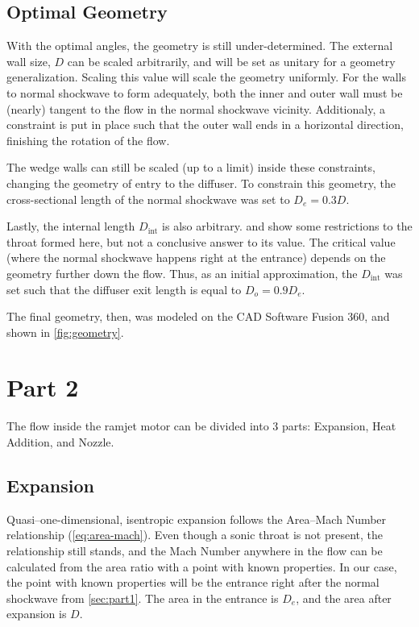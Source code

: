 \documentclass[12pt, openright, oneside, a4paper, english]{unbtex}
\begin{document}
\section{Optimal Geometry}

With the optimal angles, the geometry is still under-determined. The external wall size, \(D\) can be scaled arbitrarily, and will be set as unitary for a geometry generalization. Scaling this value will scale the geometry uniformly. For the walls to normal shockwave to form adequately, both the inner and outer wall must be (nearly) tangent to the flow in the normal shockwave vicinity. Additionaly, a constraint is put in place such that the outer wall ends in a horizontal direction, finishing the rotation of the flow.

The wedge walls can still be scaled (up to a limit) inside these constraints, changing the geometry of entry to the diffuser. To constrain this geometry, the cross-sectional length of the normal shockwave was set to \(D_e = 0.3 D\).

Lastly, the internal length \(D_{\operatorname{int}}\) is also arbitrary. \textcite{oswatitsch1944} and \textcite{hermann1956} show some restrictions to the throat formed here, but not a conclusive answer to its value. The critical value (where the normal shockwave happens right at the entrance) depends on the geometry further down the flow. Thus, as an initial approximation, the \(D_{\operatorname{int}}\) was set such that the diffuser exit length is equal to \(D_o = 0.9 D_e\).

The final geometry, then, was modeled on the CAD Software Fusion 360, and shown in \cref{fig:geometry}.


\chapter{Part 2}

The flow inside the ramjet motor can be divided into 3 parts: Expansion, Heat Addition, and Nozzle.

\section{Expansion}
\label{sec:expansion}

Quasi--one-dimensional, isentropic expansion follows the Area--Mach Number relationship (\cref{eq:area-mach}). Even though a sonic throat is not present, the relationship still stands, and the Mach Number anywhere in the flow can be calculated from the area ratio with a point with known properties. In our case, the point with known properties will be the entrance right after the normal shockwave from \cref{sec:part1}. The area in the entrance is \(D_e\), and the area after expansion is \(D\).
\end{document}
